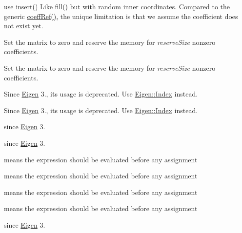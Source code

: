 \begin{DoxyRefList}
use insert() Like \hyperlink{class_eigen_1_1_dynamic_sparse_matrix_a70c8f529b38fd5b7d93d6dfe1a122723}{fill()} but with random inner coordinates. Compared to the generic \hyperlink{class_eigen_1_1_dynamic_sparse_matrix_a17093cd39bd0e6ebd6250bc5feb61a0f}{coeff\+Ref()}, the unique limitation is that we assume the coefficient does not exist yet.  
\item[\label{deprecated__deprecated000041}%
\Hypertarget{deprecated__deprecated000041}%
Member \hyperlink{class_eigen_1_1_dynamic_sparse_matrix_abade0bf46139d8577aa24ead30c76771}{Eigen\+:\+:Dynamic\+Sparse\+Matrix$<$ \+\_\+\+Scalar, \+\_\+\+Options, \+\_\+\+Storage\+Index $>$\+:\+:start\+Fill} (Index reserve\+Size=1000)]Set the matrix to zero and reserve the memory for {\itshape reserve\+Size} nonzero coefficients. 

Set the matrix to zero and reserve the memory for {\itshape reserve\+Size} nonzero coefficients.  
\item[\label{deprecated__deprecated000006}%
\Hypertarget{deprecated__deprecated000006}%
Member \hyperlink{group___core___module_a554f30542cc2316add4b1ea0a492ff02}{Eigen\+:\+:Eigen\+Base$<$ Derived $>$\+:\+:Index} ]Since \hyperlink{namespace_eigen}{Eigen} 3., its usage is deprecated. Use \hyperlink{namespace_eigen_a62e77e0933482dafde8fe197d9a2cfde}{Eigen\+::\+Index} instead. 

Since \hyperlink{namespace_eigen}{Eigen} 3., its usage is deprecated. Use \hyperlink{namespace_eigen_a62e77e0933482dafde8fe197d9a2cfde}{Eigen\+::\+Index} instead.  
\item[\label{deprecated__deprecated000018}%
\Hypertarget{deprecated__deprecated000018}%
Member \hyperlink{group___eigenvalues___module_a5bff6a6bc0efac67d52c60c2c3deb9ee}{Eigen\+:\+:Eigen\+Solver$<$ \+\_\+\+Matrix\+Type $>$\+:\+:Index} ]since \hyperlink{namespace_eigen}{Eigen} 3. 

since \hyperlink{namespace_eigen}{Eigen} 3.  
\item[\label{deprecated__deprecated000012}%
\Hypertarget{deprecated__deprecated000012}%
Member \hyperlink{group__flags_ga0972b20dc004d13984e642b3bd12532e}{Eigen\+:\+:Eval\+Before\+Assigning\+Bit} ]means the expression should be evaluated before any assignment 

means the expression should be evaluated before any assignment 

means the expression should be evaluated before any assignment 

means the expression should be evaluated before any assignment  
\item[\label{deprecated__deprecated000019}%
\Hypertarget{deprecated__deprecated000019}%
Member \hyperlink{group___eigenvalues___module_a46a0ff3841059479ec314e56a5645302}{Eigen\+:\+:Generalized\+Eigen\+Solver$<$ \+\_\+\+Matrix\+Type $>$\+:\+:Index} ]since \hyperlink{namespace_eigen}{Eigen} 3. 


\end{DoxyRefList}
